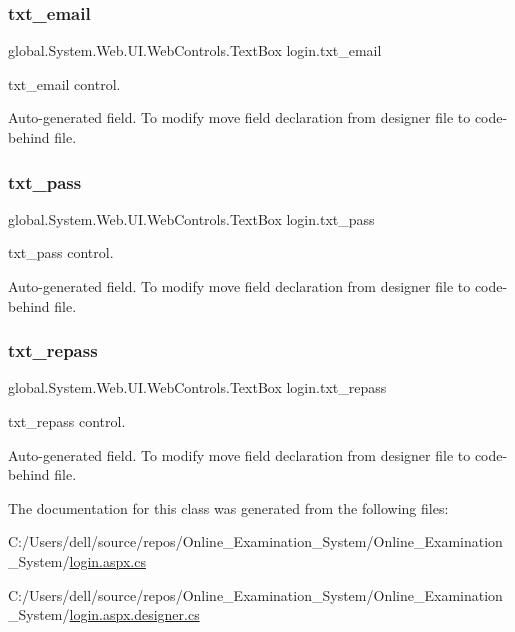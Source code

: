 \subsubsection{\texorpdfstring{txt\_email}{txt\_email}}
{\footnotesize\ttfamily global.\+System.\+Web.\+U\+I.\+Web\+Controls.\+Text\+Box login.\+txt\+\_\+email\hspace{0.3cm}{\ttfamily [protected]}}



txt\+\_\+email control. 

Auto-\/generated field. To modify move field declaration from designer file to code-\/behind file. \mbox{\label{classlogin_aef922cd4200cc949cef8d65d63d986ff}} 
\subsubsection{\texorpdfstring{txt\_pass}{txt\_pass}}
{\footnotesize\ttfamily global.\+System.\+Web.\+U\+I.\+Web\+Controls.\+Text\+Box login.\+txt\+\_\+pass\hspace{0.3cm}{\ttfamily [protected]}}



txt\+\_\+pass control. 

Auto-\/generated field. To modify move field declaration from designer file to code-\/behind file. \mbox{\label{classlogin_ab0c31481e73eaec76f425b82ad612957}} 
\subsubsection{\texorpdfstring{txt\_repass}{txt\_repass}}
{\footnotesize\ttfamily global.\+System.\+Web.\+U\+I.\+Web\+Controls.\+Text\+Box login.\+txt\+\_\+repass\hspace{0.3cm}{\ttfamily [protected]}}



txt\+\_\+repass control. 

Auto-\/generated field. To modify move field declaration from designer file to code-\/behind file. 

The documentation for this class was generated from the following files\+:\begin{DoxyCompactItemize}
\item 
C\+:/\+Users/dell/source/repos/\+Online\+\_\+\+Examination\+\_\+\+System/\+Online\+\_\+\+Examination\+\_\+\+System/\mbox{\hyperlink{login_8aspx_8cs}{login.\+aspx.\+cs}}\item 
C\+:/\+Users/dell/source/repos/\+Online\+\_\+\+Examination\+\_\+\+System/\+Online\+\_\+\+Examination\+\_\+\+System/\mbox{\hyperlink{login_8aspx_8designer_8cs}{login.\+aspx.\+designer.\+cs}}\end{DoxyCompactItemize}
